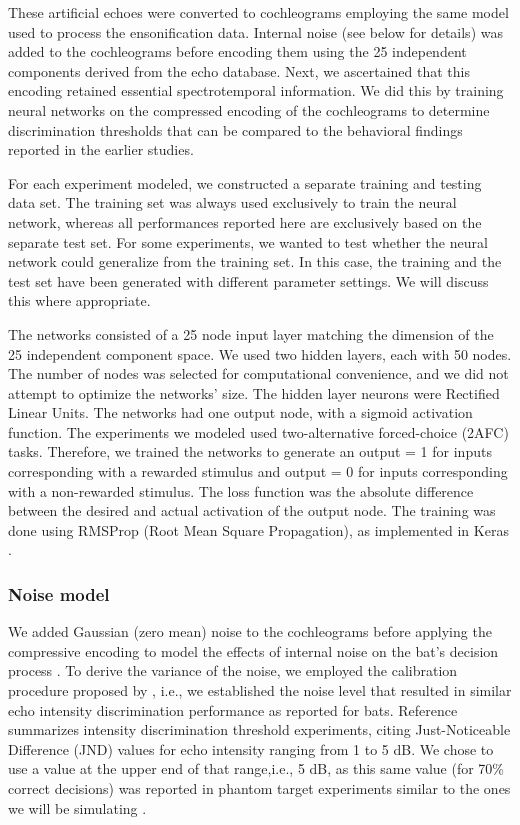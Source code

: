 \documentclass[10pt,letterpaper]{article}
\begin{document}
These artificial echoes were converted to cochleograms employing the same model \cite{Wiegrebe2008} used to process the ensonification data. Internal noise (see below for details) was added to the cochleograms before encoding them using the 25 independent components derived from the echo database. Next, we ascertained that this encoding retained essential spectrotemporal information. We did this by training neural networks on the compressed encoding of the cochleograms to determine discrimination thresholds that can be compared to the behavioral findings reported in the earlier studies.

For each experiment modeled, we constructed a separate training and testing data set. The training set was always used exclusively to train the neural network, whereas all performances reported here are exclusively based on the separate test set. For some experiments, we wanted to test whether the neural network could generalize from the training set. In this case, the training and the test set have been generated with different parameter settings. We will discuss this where appropriate.

The networks consisted of a 25 node input layer matching the dimension of the 25 independent component space. We used two hidden layers, each with 50 nodes. The number of nodes was selected for computational convenience, and we did not attempt to optimize the networks' size. The hidden layer neurons were Rectified Linear Units. The networks had one output node, with a sigmoid activation function. The experiments we modeled used two-alternative forced-choice (2AFC) tasks. Therefore, we trained the networks to generate an output = 1 for inputs corresponding with a rewarded stimulus and output = 0 for inputs corresponding with a non-rewarded stimulus. The loss function was the absolute difference between the desired and actual activation of the output node. The training was done using RMSProp (Root Mean Square Propagation), as implemented in Keras \cite{Keras}.

\subsubsection{Noise model}

We added Gaussian (zero mean) noise to the cochleograms before applying the compressive encoding to model the effects of internal noise on the bat's decision process \cite{Wiegrebe2008,Dau1996}. To derive the variance of the noise, we employed the calibration procedure proposed by \cite{Dau1996}, i.e., we established the noise level that resulted in similar echo intensity discrimination performance as reported for bats. Reference \cite{Schnitzler1980} summarizes intensity discrimination threshold experiments, citing Just-Noticeable Difference (JND) values for echo intensity ranging from 1 to 5 dB. We chose to use a value at the upper end of that range,i.e., 5 dB, as this same value (for 70\% correct decisions) was reported in phantom target experiments similar to the ones we will be simulating \cite{Heinrich2011}.
\end{document}
